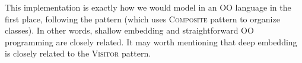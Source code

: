 This implementation is exactly how we would model \dsl in an OO language in the first
place, following the \interp pattern (which uses \textsc{Composite} pattern to
organize classes).
In other words, shallow embedding and straightforward OO programming are closely
related.
It may worth mentioning that deep embedding is closely related to the \textsc{Visitor} pattern.
